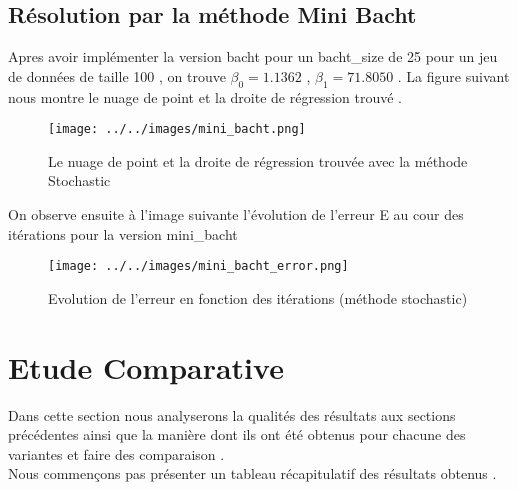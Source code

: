 \documentclass[12pt,a4paper]{article}
\begin{document}
\subsection{Résolution par la méthode Mini Bacht}

Apres avoir implémenter la version bacht pour un bacht\_size de 25 pour un jeu de données de taille 100 , on trouve $\beta_{0} =1.1362$ , $\beta_{1} = 71.8050$ . La figure suivant nous montre le nuage de point et la droite de régression trouvé .

\vspace{0.2in}
\begin{figure}[here]
\begin{center}
\texttt{[image: ../../images/mini\_bacht.png]}
\end{center}
\caption{Le nuage de point et la droite de régression trouvée avec la méthode Stochastic}
\end{figure}

\newpage
On observe ensuite à l'image suivante l'évolution de l'erreur E au cour des itérations pour la version mini\_bacht


\begin{figure}[here]
\begin{center}
\texttt{[image: ../../images/mini\_bacht\_error.png]}
\end{center}
\caption{Evolution de l'erreur en fonction des itérations (méthode stochastic)}
\end{figure}
\vspace{0.2in}  


\section{Etude Comparative }

Dans cette section nous analyserons la qualités des résultats aux sections précédentes ainsi que la manière dont ils ont été obtenus pour chacune des variantes et faire des comparaison . \\

Nous commençons pas présenter un tableau récapitulatif des résultats obtenus . \\
\end{document}
